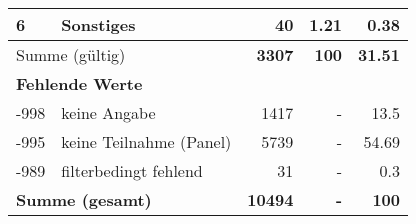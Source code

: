 \begin{longtable}{lXrrr}
     6 &
     \multicolumn{1}{X}{ Sonstiges   } &


       \num{40} &
       \num[round-mode=places,round-precision=2]{1.21} &
         \num[round-mode=places,round-precision=2]{0.38} \\
     \midrule
     \multicolumn{2}{l}{Summe (gültig)} &
       \textbf{\num{3307}} &
     \textbf{\num{100}} &
       \textbf{\num[round-mode=places,round-precision=2]{31.51}} \\
     \multicolumn{5}{l}{\textbf{Fehlende Werte}}\\
       -998 &
       keine Angabe &
         \num{1417} &
        - &
         \num[round-mode=places,round-precision=2]{13.5} \\
       -995 &
       keine Teilnahme (Panel) &
         \num{5739} &
        - &
         \num[round-mode=places,round-precision=2]{54.69} \\
       -989 &
       filterbedingt fehlend &
         \num{31} &
        - &
         \num[round-mode=places,round-precision=2]{0.3} \\
     \midrule
     \multicolumn{2}{l}{\textbf{Summe (gesamt)}} &
          \textbf{\num{10494}} &
        \textbf{-} &
        \textbf{\num{100}} \\
     \bottomrule
     \end{longtable}
     
